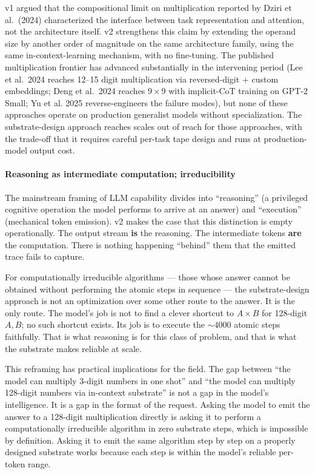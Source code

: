 \documentclass[twocolumn,switch,10pt]{article}
\begin{document}
v1 argued that the compositional limit on multiplication reported by
Dziri et al.~(2024) characterized the interface between task
representation and attention, not the architecture itself. v2
strengthens this claim by extending the operand size by another
order of magnitude on the same architecture family, using the same
in-context-learning mechanism, with no fine-tuning. The published
multiplication frontier has advanced substantially in the
intervening period (Lee et al.~2024 reaches 12--15 digit multiplication
via reversed-digit + custom embeddings; Deng et al.~2024 reaches
\(9 \times 9\) with implicit-CoT training on GPT-2 Small; Yu et al.
2025 reverse-engineers the failure modes), but none of these
approaches operate on production generalist models without
specialization. The substrate-design approach reaches scales out of
reach for those approaches, with the trade-off that it requires
careful per-task tape design and runs at production-model output
cost.

\paragraph{Reasoning as intermediate computation; irreducibility}\label{reasoning-as-intermediate-computation-irreducibility}

The mainstream framing of LLM capability divides into ``reasoning''
(a privileged cognitive operation the model performs to arrive at
an answer) and ``execution'' (mechanical token emission). v2 makes
the case that this distinction is empty operationally. The output
stream \textbf{is} the reasoning. The intermediate tokens \textbf{are} the
computation. There is nothing happening ``behind'' them that the
emitted trace fails to capture.

For computationally irreducible algorithms --- those whose answer
cannot be obtained without performing the atomic steps in sequence
--- the substrate-design approach is not an optimization over some
other route to the answer. It is the only route. The model's job
is not to find a clever shortcut to \(A \times B\) for 128-digit
\(A, B\); no such shortcut exists. Its job is to execute the
\(\sim 4000\) atomic steps faithfully. That is what reasoning is for
this class of problem, and that is what the substrate makes
reliable at scale.

This reframing has practical implications for the field. The
gap between ``the model can multiply 3-digit numbers in one shot''
and ``the model can multiply 128-digit numbers via in-context
substrate'' is not a gap in the model's intelligence. It is a gap
in the format of the request. Asking the model to emit the answer
to a 128-digit multiplication directly is asking it to perform a
computationally irreducible algorithm in zero substrate steps,
which is impossible by definition. Asking it to emit the same
algorithm step by step on a properly designed substrate works
because each step is within the model's reliable per-token
range.
\end{document}
